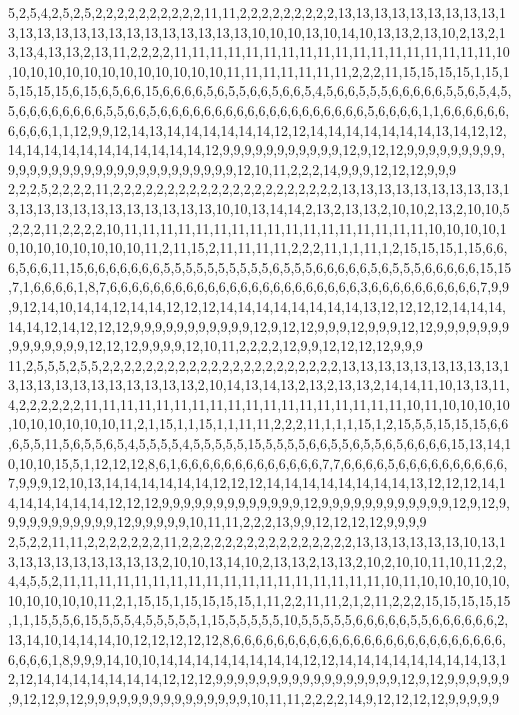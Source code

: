 5,2,5,4,2,5,2,5,2,2,2,2,2,2,2,2,2,2,11,11,2,2,2,2,2,2,2,2,2,13,13,13,13,13,13,13,13,13,13,13,13,13,13,13,13,13,13,13,13,13,13,13,10,10,10,13,10,14,10,13,13,2,13,10,2,13,2,13,13,4,13,13,2,13,11,2,2,2,2,11,11,11,11,11,11,11,11,11,11,11,11,11,11,11,11,11,11,10,10,10,10,10,10,10,10,10,10,10,10,10,11,11,11,11,11,11,11,2,2,2,11,15,15,15,15,1,15,15,15,15,15,6,15,6,5,6,6,15,6,6,6,6,5,6,5,5,6,6,5,6,6,5,4,5,6,6,5,5,5,6,6,6,6,6,5,5,6,5,4,5,5,6,6,6,6,6,6,6,6,5,5,6,6,5,6,6,6,6,6,6,6,6,6,6,6,6,6,6,6,6,6,6,6,5,6,6,6,6,1,1,6,6,6,6,6,6,6,6,6,6,1,1,12,9,9,12,14,13,14,14,14,14,14,14,12,12,14,14,14,14,14,14,14,13,14,12,12,14,14,14,14,14,14,14,14,14,14,14,12,9,9,9,9,9,9,9,9,9,9,9,12,9,12,12,9,9,9,9,9,9,9,9,9,9,9,9,9,9,9,9,9,9,9,9,9,9,9,9,9,9,9,9,9,9,12,10,11,2,2,2,14,9,9,9,12,12,12,9,9,9
2,2,2,5,2,2,2,2,11,2,2,2,2,2,2,2,2,2,2,2,2,2,2,2,2,2,2,2,2,2,13,13,13,13,13,13,13,13,13,13,13,13,13,13,13,13,13,13,13,13,13,10,10,13,14,14,2,13,2,13,13,2,10,10,2,13,2,10,10,5,2,2,2,11,2,2,2,2,10,11,11,11,11,11,11,11,11,11,11,11,11,11,11,11,11,11,10,10,10,10,10,10,10,10,10,10,10,10,11,2,11,15,2,11,11,11,11,2,2,2,11,1,1,11,1,2,15,15,15,1,15,6,6,6,5,6,6,11,15,6,6,6,6,6,6,6,5,5,5,5,5,5,5,5,5,5,6,5,5,5,6,6,6,6,6,5,6,5,5,5,6,6,6,6,6,15,15,7,1,6,6,6,6,1,8,7,6,6,6,6,6,6,6,6,6,6,6,6,6,6,6,6,6,6,6,6,6,6,6,3,6,6,6,6,6,6,6,6,6,6,7,9,9,9,12,14,10,14,14,12,14,14,12,12,12,14,14,14,14,14,14,14,14,13,12,12,12,12,14,14,14,14,14,12,14,12,12,12,9,9,9,9,9,9,9,9,9,9,9,12,9,12,12,9,9,9,12,9,9,9,12,12,9,9,9,9,9,9,9,9,9,9,9,9,9,9,12,12,12,9,9,9,9,12,10,11,2,2,2,2,12,9,9,12,12,12,12,9,9,9
11,2,5,5,5,2,5,5,2,2,2,2,2,2,2,2,2,2,2,2,2,2,2,2,2,2,2,2,2,2,13,13,13,13,13,13,13,13,13,13,13,13,13,13,13,13,13,13,13,13,2,10,14,13,14,13,2,13,2,13,13,2,14,14,11,10,13,13,11,4,2,2,2,2,2,2,11,11,11,11,11,11,11,11,11,11,11,11,11,11,11,11,11,11,10,11,10,10,10,10,10,10,10,10,10,10,11,2,1,15,1,1,15,1,1,11,11,2,2,2,11,1,1,1,15,1,2,15,5,5,15,15,15,6,6,6,5,5,11,5,6,5,5,6,5,4,5,5,5,5,4,5,5,5,5,5,15,5,5,5,5,6,6,5,5,6,5,5,6,5,6,6,6,6,15,13,14,10,10,10,15,5,1,12,12,12,8,6,1,6,6,6,6,6,6,6,6,6,6,6,6,6,7,7,6,6,6,6,5,6,6,6,6,6,6,6,6,6,6,7,9,9,9,12,10,13,14,14,14,14,14,14,12,12,12,14,14,14,14,14,14,14,14,13,12,12,12,14,14,14,14,14,14,14,12,12,12,9,9,9,9,9,9,9,9,9,9,9,9,9,12,9,9,9,9,9,9,9,9,9,9,9,9,12,9,12,9,9,9,9,9,9,9,9,9,9,9,12,9,9,9,9,9,10,11,11,2,2,2,13,9,9,12,12,12,12,9,9,9,9
2,5,2,2,11,11,2,2,2,2,2,2,2,11,2,2,2,2,2,2,2,2,2,2,2,2,2,2,2,2,13,13,13,13,13,13,10,13,13,13,13,13,13,13,13,13,13,2,10,10,13,14,10,2,13,13,2,13,13,2,10,2,10,10,11,10,11,2,2,4,4,5,5,2,11,11,11,11,11,11,11,11,11,11,11,11,11,11,11,11,11,11,10,11,10,10,10,10,10,10,10,10,10,10,11,2,1,15,15,1,15,15,15,15,1,11,2,2,11,11,2,1,2,11,2,2,2,15,15,15,15,15,1,1,15,5,5,6,15,5,5,5,4,5,5,5,5,5,1,15,5,5,5,5,5,10,5,5,5,5,5,6,6,6,6,6,5,5,6,6,6,6,6,6,2,13,14,10,14,14,14,10,12,12,12,12,12,8,6,6,6,6,6,6,6,6,6,6,6,6,6,6,6,6,6,6,6,6,6,6,6,6,6,6,6,6,6,1,8,9,9,9,14,10,10,14,14,14,14,14,14,14,14,12,12,14,14,14,14,14,14,14,14,13,12,12,14,14,14,14,14,14,14,12,12,12,9,9,9,9,9,9,9,9,9,9,9,9,9,9,9,9,9,12,9,12,9,9,9,9,9,9,9,12,12,9,12,9,9,9,9,9,9,9,9,9,9,9,9,9,9,9,10,11,11,2,2,2,2,14,9,12,12,12,12,9,9,9,9,9
